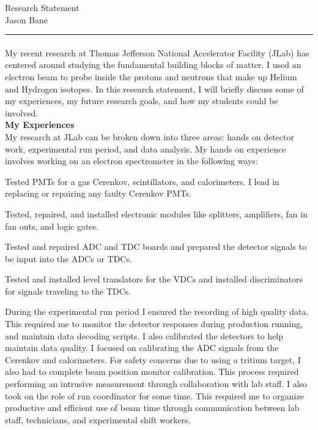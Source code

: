 \documentclass[12pt,letterpaper]{article}
\begin{document}
\begin{center}	
	{\huge  Research Statement}\\
	{\large Jason Bane}
\end{center}
\hrule
\paragraph{}My recent research at Thomas Jefferson National Accelerator Facility (JLab) has centered around studying the fundamental building blocks of matter. I used an electron beam to probe inside the protons and neutrons that make up Helium and Hydrogen isotopes. In this research statement, I will briefly discuss some of my experiences, my future research goals, and how my students could be involved. \\

\noindent\textbf{My Experiences}\\
\indent My research at JLab can be broken down into three areas: hands on detector work, experimental run period, and data analysis. My hands on experience involves working on an electron spectrometer in the following ways:
\begin{itemize*}
\item Tested PMTs for a gas Cerenkov, scintillators, and calorimeters. I lead in replacing or repairing any faulty Cerenkov PMTs.
\item Tested, repaired, and installed electronic modules like splitters, amplifiers, fan in fan outs, and logic gates. 
\item Tested and repaired ADC and TDC boards and prepared the detector signals to be input into the ADCs or TDCs. 
\item  Tested and installed level translators for the VDCs and installed discriminators for signals traveling to the TDCs.
\end{itemize*}

\indent During the experimental run period I ensured the recording of high quality data. This required me to monitor the detector responses during production running, and maintain data decoding scripts. I also calibrated the detectors to help maintain data quality. I focused on calibrating the ADC signals from the Cerenkov and calorimeters. For safety concerns due to using a tritium target, I also had to complete beam position monitor calibration. This process required performing an intrusive measurement through collaboration with lab staff. I also took on the role of run coordinator for some time. This required me to organize productive and efficient use of beam time through communication between lab staff, technicians, and experimental shift workers.\\
\end{document}
